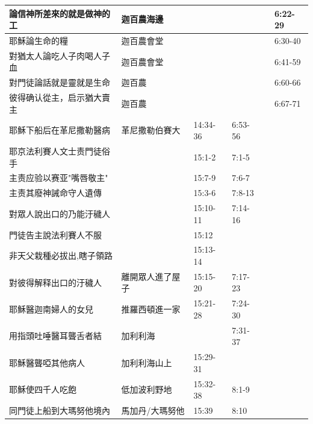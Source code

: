 \begin{table}[H]
\begin{tabular}{p{13.07em}|p{8.43em}|p{5.285em}|p{5.57em}|p{5.285em}|p{4.855em}}
論信神所差來的就是做神的工& 迦百農海邊& \multicolumn{1}{r|}{} & \multicolumn{1}{r|}{} &       & \multicolumn{1}{p{4.855em}}{6:22-29} \\\midrule
耶穌論生命的糧 & 迦百農會堂   & \multicolumn{1}{r|}{} & \multicolumn{1}{r|}{} &       & \multicolumn{1}{p{4.855em}}{6:30-40} \\\midrule
對猶太人論吃人子肉喝人子血& 迦百農會堂   & \multicolumn{1}{r|}{} & \multicolumn{1}{r|}{} &       & \multicolumn{1}{p{4.855em}}{6:41-59} \\\midrule

對門徒論話就是靈就是生命& 迦百農& \multicolumn{1}{r|}{} & \multicolumn{1}{r|}{} &       & \multicolumn{1}{p{4.855em}}{6:60-66} \\\midrule
彼得确认從主，启示猶大賣主& 迦百農& \multicolumn{1}{r|}{} & \multicolumn{1}{r|}{} &       & \multicolumn{1}{p{4.855em}}{6:67-71} \\\midrule


耶穌下船后在革尼撒勒醫病 & 革尼撒勒伯賽大 & 14:34-36 & 6:53-56 &       &  \\ \midrule

耶京法利賽人文士责門徒俗手&  & 15:1-2& 7:1-5&       &  \\\midrule
主责应验以赛亚"嘴唇敬主"&  & 15:7-9& 7:6-7 &       &  \\\midrule
主责其廢神誡命守人遺傳&  & 15:3-6& 7:8-13 &       &  \\\midrule

對眾人說出口的乃能汙穢人&  & 15:10-11 & 7:14-16&       &  \\\midrule
門徒告主說法利賽人不服&  & 15:12&  &       &  \\\midrule
非天父栽種必拔出,瞎子領路&  & 15:13-14 &  &       &  \\\midrule
對彼得解释出口的汙穢人& 離開眾人進了屋子& 15:15-20& 7:17-23&       &  \\\midrule

耶穌醫迦南婦人的女兒 & \multicolumn{1}{p{7.93em}|}{推羅西頓進一家} & \multicolumn{1}{p{5.285em}|}{15:21-28} & \multicolumn{1}{p{5.57em}|}{7:24-30} & \multicolumn{1}{r|}{} &  \\\midrule
用指頭吐唾醫耳聾舌者結& \multicolumn{1}{p{7.93em}|}{加利利海} & \multicolumn{1}{p{5.285em}|}{} & \multicolumn{1}{p{5.57em}|}{7:31-37} & \multicolumn{1}{r|}{} &  \\\midrule
耶穌醫聾啞其他病人 & \multicolumn{1}{p{7.93em}|}{加利利海山上} & \multicolumn{1}{p{5.285em}|}{15:29-31} & \multicolumn{1}{p{5.57em}|}{} & \multicolumn{1}{r|}{} &  \\\midrule
\multicolumn{1}{l|}{耶穌使四千人吃飽} & \multicolumn{1}{p{7.93em}|}{低加波利野地} & \multicolumn{1}{p{5.285em}|}{15:32-38} & \multicolumn{1}{p{5.57em}|}{8:1-9} & \multicolumn{1}{r|}{} &  \\ \midrule
同門徒上船到大瑪努他境內& \multicolumn{1}{p{7.93em}|}{馬加丹/大瑪努他} & \multicolumn{1}{p{5.285em}|}{15:39} & \multicolumn{1}{p{5.57em}|}{8:10} & \multicolumn{1}{r|}{} &  \\     \bottomrule


\end{tabular}
\end{table}
